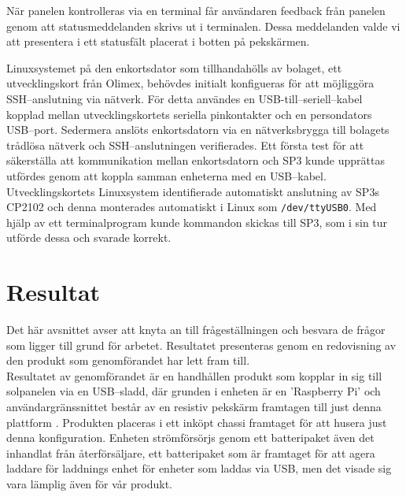 \documentclass{article}
\begin{document}
            \noindent När panelen kontrolleras via en terminal får användaren feedback från panelen genom att statusmeddelanden skrivs ut i terminalen. Dessa meddelanden valde vi att presentera i ett statusfält placerat i botten på pekskärmen.


            
            Linuxsystemet på den enkortsdator som tillhandahölls av bolaget, ett utvecklingskort från Olimex, behövdes initialt konfigueras för att möjliggöra SSH--anslutning via nätverk. För detta användes en USB-till--seriell--kabel kopplad mellan utvecklings\-kortets seriella pinkontakter och en persondators USB--port. Seder\-mera anslöts enkortsdatorn via en nätverksbrygga till bolagets trådlösa nätverk och SSH--anslutningen verifierades. Ett första test för att säkerställa att kommunikation mellan enkortsdatorn och SP3 kunde upprättas utfördes genom att koppla samman enheterna med en USB--kabel. Utvecklings\-kortets Linuxsystem identifierade automatiskt anslutning av SP3s CP2102 och denna monterades automatiskt i \hbox{Linux} som \texttt{/dev/ttyUSB0}. Med hjälp av ett terminal\-program kunde kommandon skickas till SP3, som i sin tur utförde dessa och svarade korrekt.


    \newpage

    \section{Resultat} %
    \label{sec:resultat}
        Det här avsnittet avser att knyta an till frågeställningen och besvara de frågor som ligger till grund för arbetet. Resultatet presenteras genom en redovisning av den produkt som genomförandet har lett fram till. \\

        \noindent Resultatet av genomförandet är en handhållen produkt som kopplar in sig till sol\-panel\-en via en USB--sladd, där grunden i enheten är en 'Raspberry Pi' och användargränssnittet består av en resistiv pekskärm framtagen till just denna plattform \cite{Ada}. Produkten placeras i ett inköpt chassi framtaget för att husera just denna konfiguration. Enheten strömförsörjs genom ett batteripaket även det inhandlat från återförsäljare, ett batteripaket som är framtaget för att agera laddare för laddnings enhet för enheter som laddas via USB, men det visade sig vara lämplig även för vår produkt.
\end{document}
